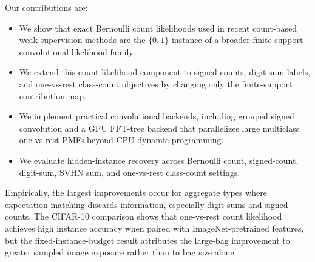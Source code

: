 Our contributions are:
\begin{itemize}
  \item We show that exact Bernoulli count likelihoods used in recent count-based weak-supervision methods are the $\{0,1\}$ instance of a broader finite-support convolutional likelihood family.
  \item We extend this count-likelihood component to signed counts, digit-sum labels, and one-vs-rest class-count objectives by changing only the finite-support contribution map.
  \item We implement practical convolutional backends, including grouped signed convolution and a GPU FFT-tree backend that parallelizes large multiclass one-vs-rest PMFs beyond CPU dynamic programming.
  \item We evaluate hidden-instance recovery across Bernoulli count, signed-count, digit-sum, SVHN sum, and one-vs-rest class-count settings.
\end{itemize}

Empirically, the largest improvements occur for aggregate types where expectation matching discards information, especially digit sums and signed counts.
The CIFAR-10 comparison shows that one-vs-rest count likelihood achieves high instance accuracy when paired with ImageNet-pretrained features, but the fixed-instance-budget result attributes the large-bag improvement to greater sampled image exposure rather than to bag size alone.
